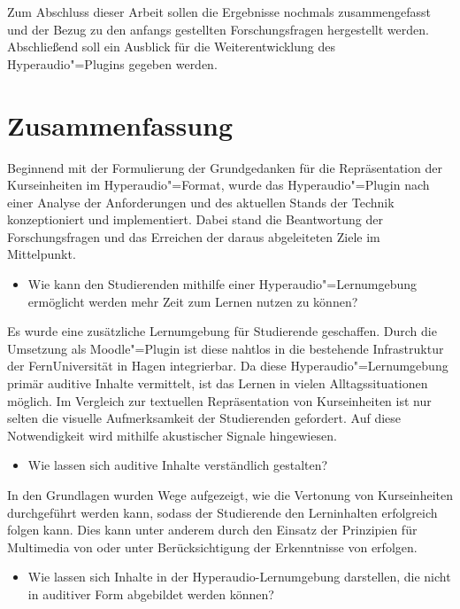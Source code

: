 Zum Abschluss dieser Arbeit sollen die Ergebnisse nochmals zusammengefasst und der Bezug zu den anfangs gestellten Forschungsfragen hergestellt werden. Abschließend soll ein Ausblick für die Weiterentwicklung des Hyperaudio"=Plugins gegeben werden.

\section{Zusammenfassung}
Beginnend mit der Formulierung der Grundgedanken für die Repräsentation der Kurseinheiten im Hyperaudio"=Format, wurde das Hyperaudio"=Plugin nach einer Analyse der Anforderungen und des aktuellen Stands der Technik konzeptioniert und implementiert. Dabei stand die Beantwortung der Forschungsfragen und das Erreichen der daraus abgeleiteten Ziele im Mittelpunkt.

\begin{itemize}
\item Wie kann den Studierenden mithilfe einer Hyperaudio"=Lernumgebung ermöglicht werden mehr Zeit zum Lernen nutzen zu können?
\end{itemize}

Es wurde eine zusätzliche Lernumgebung für Studierende geschaffen. Durch die Umsetzung als Moodle"=Plugin ist diese nahtlos in die bestehende Infrastruktur der FernUniversität in Hagen integrierbar. Da diese Hyperaudio"=Lernumgebung primär auditive Inhalte vermittelt, ist das Lernen in vielen Alltagssituationen möglich. Im Vergleich zur textuellen Repräsentation von Kurseinheiten ist nur selten die visuelle Aufmerksamkeit der Studierenden gefordert. Auf diese Notwendigkeit wird mithilfe akustischer Signale hingewiesen.

\begin{itemize}
\item Wie lassen sich auditive Inhalte verständlich gestalten?
\end{itemize}

In den Grundlagen wurden Wege aufgezeigt, wie die Vertonung von Kurseinheiten durchgeführt werden kann, sodass der Studierende den Lerninhalten erfolgreich folgen kann. Dies kann unter anderem durch den Einsatz der Prinzipien für Multimedia von \cite{mayer2009multimedia} oder unter Berücksichtigung der Erkenntnisse von \cite{donker2007gestaltung} erfolgen.

\begin{itemize}
\item Wie lassen sich Inhalte in der Hyperaudio-Lernumgebung darstellen, die nicht in auditiver Form abgebildet werden können?
\end{itemize}

